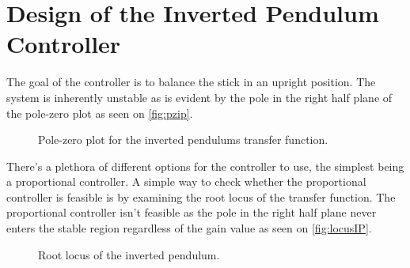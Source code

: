 \chapter{Design of the Inverted Pendulum Controller}
The goal of the controller is to balance the stick in an upright position. 
The system is inherently unstable as is evident by the pole in the right half plane of the pole-zero plot as seen on \autoref{fig:pzip}.

\begin{figure}[htbp]
\centering
\missingfigure{}
\caption{Pole-zero plot for the inverted pendulums transfer function.}
\label{fig:pzip}
\end{figure}

There's a plethora of different options for the controller to use, the simplest being a proportional controller. A simple way to check whether the proportional controller is feasible is by examining the root locus of the transfer function. The proportional controller isn't feasible as the pole in the right half plane never enters the stable region regardless of the gain value as seen on \autoref{fig:locusIP}.

\begin{figure}[htbp]
\centering
\missingfigure{}
\caption{Root locus of the inverted pendulum.}
\label{fig:locusIP}
\end{figure}


